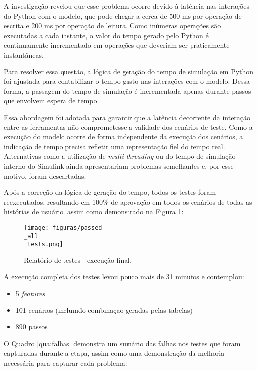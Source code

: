 A investigação revelou que esse problema ocorre devido à latência nas interações do Python com o modelo, que pode chegar a cerca de 500 ms por operação de escrita e 
200 ms por operação de leitura. Como inúmeras operações são executadas a cada instante, o valor do tempo gerado pelo Python é continuamente incrementado em operações 
que deveriam ser praticamente instantâneas.

Para resolver essa questão, a lógica de geração do tempo de simulação em Python foi ajustada para contabilizar o tempo gasto nas interações com o modelo. Dessa forma, 
a passagem do tempo de simulação é incrementada apenas durante passos que envolvem espera de tempo.

Essa abordagem foi adotada para garantir que a latência decorrente da interação entre as ferramentas não comprometesse a validade dos cenários de teste. Como a execução 
do modelo ocorre de forma independente da execução dos cenários, a indicação de tempo precisa refletir uma representação fiel do tempo real. Alternativas como a 
utilização de \textit{multi-threading} ou do tempo de simulação interno do Simulink ainda apresentariam problemas semelhantes e, por esse motivo, foram descartadas.

Após a correção da lógica de geração do tempo, todos os testes foram reexecutados, resultando em 100\% de aprovação em todos os cenários de todas as histórias de usuário, 
assim como demonstrado na Figura \ref{fig:resultado-terminal}: 

\begin{figure}[H]
\centering
\texttt{[image: figuras/passed\\\_all\\\_tests.png]}
\caption{Relatório de testes - execução final.}
\label{fig:resultado-terminal}
\end{figure}

A execução completa dos testes levou pouco mais de 31 minutos e contemplou:

\begin{itemize}
    \item 5 \textit{features}
    \item 101 cenários (incluindo combinação geradas pelas tabelas)
    \item 890 passos
\end{itemize}

O Quadro \ref{qua:falhas} demonstra um sumário das falhas nos testes que foram capturadas durante a etapa, assim como uma demonstração da melhoria 
necessária para capturar cada problema:

